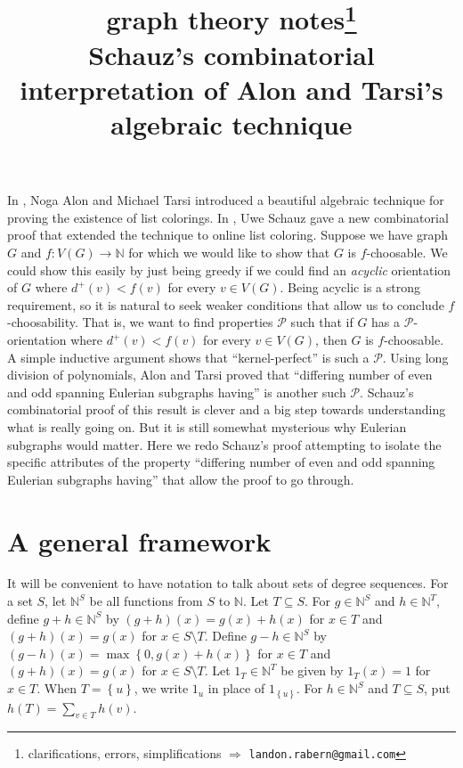 \documentclass[12pt]{article}
\title{graph theory notes\thanks{clarifications, errors, simplifications $\Rightarrow$ \texttt{landon.rabern@gmail.com}}\\ \bigskip
Schauz's combinatorial interpretation of Alon and Tarsi's algebraic technique}
\date{}
\theoremstyle{plain}
\theoremstyle{definition}
\theoremstyle{remark}
\newcommand{\fancy}[1]{\mathcal{#1}}
\newcommand{\IN}{\mathbb{N}}
\newcommand{\set}[1]{\left\{ #1 \right\}}
\newcommand{\func}[3]{#1\colon #2 \rightarrow #3}
\def\P{\fancy{P}}
\begin{document}
\maketitle

In \cite{Alon1992125}, Noga Alon and Michael Tarsi introduced a beautiful algebraic technique for proving the existence of list colorings.  In \cite{schauz2010flexible}, Uwe Schauz gave a new combinatorial proof that extended the technique to online list coloring.  Suppose we have graph $G$ and $\func{f}{V(G)}{\IN}$ for which we would like to show that $G$ is $f$-choosable.  We could show this easily by just being greedy if we could find an \emph{acyclic} orientation of $G$ where $d^+(v) < f(v)$ for every $v \in V(G)$.  Being acyclic is a strong requirement, so it is natural to seek weaker conditions that allow us to conclude $f$-choosability.  That is, we want to find properties $\P$ such that if $G$ has a $\P$-orientation where $d^+(v) < f(v)$ for every $v \in V(G)$, then $G$ is $f$-choosable.  A simple inductive argument shows that ``kernel-perfect'' is such a $\P$.  Using long division of polynomials, Alon and Tarsi proved that ``differing number of even and odd spanning Eulerian subgraphs having'' is another such $\P$.  Schauz's combinatorial proof of this result is clever and a big step towards understanding what is really going on. But it is still somewhat mysterious why Eulerian subgraphs would matter.  Here we redo Schauz's proof attempting to isolate the specific attributes of the property ``differing number of even and odd spanning Eulerian subgraphs having'' that allow the proof to go through.

\section{A general framework}
It will be convenient to have notation to talk about sets of degree sequences. For a set $S$, let $\IN^S$ be all functions from $S$ to $\IN$.  Let $T \subseteq S$. For $g\in \IN^S$ and $h \in \IN^T$, define $g+h \in \IN^S$ by $(g+h)(x) = g(x) + h(x)$ for $x \in T$ and $(g+h)(x) = g(x)$ for $x \in S\setminus T$. Define $g-h \in \IN^S$ by $(g-h)(x) = \max\set{0, g(x) + h(x)}$ for $x \in T$ and $(g+h)(x) = g(x)$ for $x \in S\setminus T$.  Let $1_T \in \IN^T$ be given by $1_T(x) = 1$ for $x \in T$.  When $T = \set{u}$, we write $1_u$ in place of $1_{\set{u}}$.  For $h \in \IN^S$ and $T \subseteq S$, put $h(T) = \sum_{v \in T} h(v)$.
\end{document}
